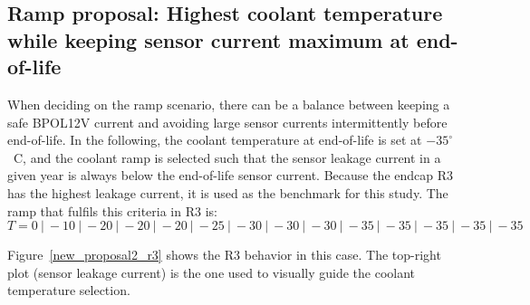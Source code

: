 \clearpage

\subsection{Ramp proposal: Highest coolant temperature while keeping sensor current maximum at
end-of-life}

When deciding on the ramp scenario, there can be a balance between keeping a safe BPOL12V current
and avoiding large sensor currents intermittently before end-of-life. In the following, the coolant
temperature at end-of-life is set at $-35^\circ$~C, and the coolant ramp is selected such that
the sensor leakage current in a given year is always below the end-of-life sensor current.
Because the endcap R3 has the highest leakage current, it is used as the benchmark for this study.
The ramp that fulfils this criteria in R3 is:
\begin{equation}
T = 0~|~{-}10~|~{-}20~|~{-}20~|~{-}20~|~{-}25~|~{-}30~|~{-}30~|~{-}30~|~{-}35~|~{-}35~|~{-}35~|~{-}35~|~{-}35
\label{eq:proposal2}
\end{equation}

Figure~\ref{new_proposal2_r3} shows the R3 behavior in this case. The top-right plot (sensor leakage
current) is the one used to visually guide the coolant temperature selection.

